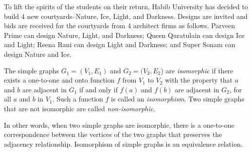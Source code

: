 \documentclass[addpoints]{exam}
\begin{document}
\begin{questions}
\question To lift the spirits of the students on their return, Habib University has decided to build 4 new courtyards--Nature, Ice, Light, and Darkness. Designs are invited and bids are received for the courtyards from 4 architect firms as follows. Parveen Prime can design Nature, Light, and Darkness; Queen Quratulain can design Ice and Light; Reena Rani can design Light and Darkness; and Super Sonam can design Nature and Ice.
  
\question  The simple graphs $G_1 = (V_1,E_1)$ and $G_2 = (V_2,E_2$) are \textit{isomorphic} if there exists a one-to-one and onto function $f$ from $V_1$ to $V_2$ with the property that $a$ and $b$ are adjacent in $G_1$ if and only if $f(a)$ and $f(b)$ are adjacent in $G_2$, for all $a$ and $b$ in $V_1$. Such a function $f$ is called an \textit{isomorphism}. Two simple graphs that are not isomorphic are called \textit{non-isomorphic}.

  In other words, when two simple graphs are isomorphic, there is a one-to-one correspondence between the vertices of the two graphs that preserves the adjacency relationship. Isomorphism of simple graphs is an equivalence relation.


\end{questions}
\end{document}

